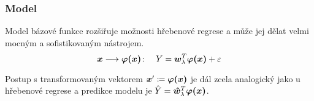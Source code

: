 \subsubsection{Model}
Model bázové funkce rozšiřuje možnosti hřebenové regrese a může jej dělat velmi mocným a sofistikovaným nástrojem.
\[\bm{x} \longrightarrow \bm{\varphi(\bm{x})} \colon \quad Y = \bm{w}_\lambda^T\bm{\varphi(\bm{x})} + \varepsilon\]

Postup s transformovaným vektorem $\bm{x}' \coloneqq \bm{\varphi(\bm{x})}$ je dál zcela analogický jako u hřebenové regrese a predikce modelu je $\hat{Y} = \bm{\hat{w}}_\lambda^T\bm{\varphi(\bm{x})}$.
